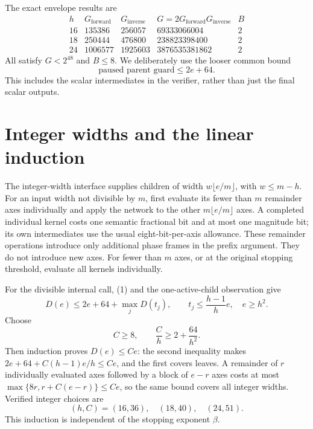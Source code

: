 \documentclass[11pt]{article}
\begin{document}
The exact envelope results are
\[
\begin{array}{c|r|r|r|r}
 h&G_{\mathrm{forward}}&G_{\mathrm{inverse}}&
       G=2G_{\mathrm{forward}}G_{\mathrm{inverse}}&B\\\hline
16&135386&256057&69333066004&2\\
18&250444&476800&238823398400&2\\
24&1006577&1925603&3876535381862&2
\end{array}
\]
All satisfy $G<2^{48}$ and $B\le8$. We deliberately use the looser
common bound
\[
               \text{paused parent guard}\le 2e+64.       \tag{1}
\]
This includes the scalar intermediates in the verifier, rather than just
the final scalar outputs.

\section{Integer widths and the linear induction}
The integer-width interface supplies children of width
$w\lfloor e/m\rfloor$, with $w\le m-h$.
For an input width not divisible by $m$, first evaluate its fewer than $m$
remainder axes individually and apply the network to the other
$m\lfloor e/m\rfloor$ axes. A completed individual kernel costs one
semantic fractional bit and at most one magnitude bit; its own
intermediates use the usual eight-bit-per-axis allowance.
These remainder operations introduce only additional phase frames in the
prefix argument. They do not introduce new axes. For fewer than $m$ axes,
or at the original stopping threshold, evaluate all kernels individually.

For the divisible internal call, (1) and the one-active-child observation give
\[
 D(e)\le 2e+64+\max_j D(t_j),\qquad
 t_j\le\frac{h-1}{h}e,\quad e\ge h^2.
\]
Choose
\[
 C\ge8,\qquad \frac{C}{h}\ge 2+\frac{64}{h^2}.
\]
Then induction proves $D(e)\le Ce$: the second inequality makes
$2e+64+C(h-1)e/h\le Ce$, and the first covers leaves. A remainder of
$r$ individually evaluated axes followed by a block of $e-r$ axes
costs at most $\max\{8r,r+C(e-r)\}\le Ce$, so the same bound covers
all integer widths. Verified integer choices are
\[
       (h,C)=(16,36),\quad(18,40),\quad(24,51).
\]
This induction is independent of the stopping exponent $\beta$.
\end{document}
